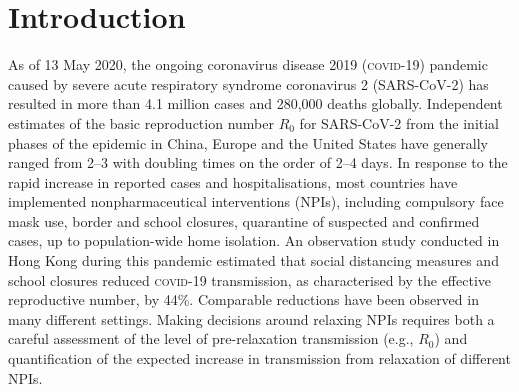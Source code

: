 \section{Introduction}
As of 13 May 2020, the ongoing coronavirus disease 2019 (\textsc{covid}-19) pandemic caused by severe acute respiratory syndrome coronavirus 2 (SARS-CoV-2) has resulted in more than 4.1 million cases and 280,000 deaths globally\cite{WHO:WHOSituationReport:2020}. Independent estimates of the basic reproduction number $R_0$ for SARS-CoV-2 from the initial phases of the epidemic in China, Europe and the United States have generally ranged from 2–3 with doubling times on the order of 2–4 days. In response to the rapid increase in reported cases and hospitalisations, most countries have implemented nonpharmaceutical interventions (NPIs), including compulsory face mask use, border and school closures, quarantine of suspected and confirmed cases, up to population-wide home isolation\cite{HITCOVIDTeam:HealthInterventionsTracking:2020}. An observation study conducted in Hong Kong during this pandemic estimated that social distancing measures and school closures reduced \textsc{covid}-19 transmission, as characterised by the effective reproductive number, by 44\%\cite{Cowling:ImpactAssessmentNonpharmaceutical:2020}. Comparable reductions have been observed in many different settings\cite{Flaxman:Report13Estimating:2020}. Making decisions around relaxing NPIs requires both a careful assessment of the level of pre-relaxation transmission (e.g., $R_0$) and quantification of the expected increase in transmission from relaxation of different NPIs. 

